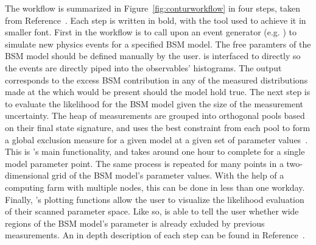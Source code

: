The \contur workflow is summarized in Figure~\ref{fig:conturworkflow} in four steps, taken from Reference~\cite{conturmanual}. Each step is written in bold, with the tool used to achieve it in smaller font. First in the workflow is to call upon an event generator (e.g. \herwig) to simulate new physics events for a specified BSM model. The free paramters of the BSM model should be defined manually by the user. \herwig is interfaced to \rivet directly so the events are directly piped into the observables' histograms. The \rivet output corresponds to the excess BSM contribution in any of the measured distributions made at the \LHC which would be present should the model hold true. The next step is to evaluate the likelihood for the BSM model given the size of the measurement uncertainty. The heap of measurements are grouped into orthogonal pools based on their final state signature, and \contur uses the best constraint from each pool to form a global exclusion measure for a given model at a given set of parameter values~\cite{contur-manual}. This is \contur's main functionality, and takes around one hour to complete for a single model parameter point. The same process is repeated for many points in a two-dimensional grid of the BSM model's parameter values. With the help of a computing farm with multiple nodes, this can be done in less than one workday. Finally, \contur's plotting functions allow the user to visualize the likelihood evaluation of their scanned parameter space. Like so, \contur is able to tell the user whether wide regions of the BSM model's parameter is already exluded by \LHC previous measurements. An in depth description of each step can be found in Reference~\cite{conturmanual}. 
